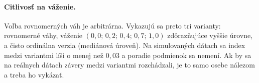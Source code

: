 \paragraph{Citlivosť na váženie.} Voľba rovnomerných váh je arbitrárna. Vykazujú sa preto tri varianty: rovnomerné váhy, váženie $(0{,}0;\,0{,}2;\,0{,}4;\,0{,}7;\,1{,}0)$ zdôrazňujúce vyššie úrovne, a čisto ordinálna verzia (mediánová úroveň). Na simulovaných dátach sa index medzi variantmi líši o menej než $0{,}03$ a poradie podmienok sa nemení. Ak by sa na reálnych dátach závery medzi variantmi rozchádzali, je to samo osebe nálezom a treba ho vykázať.
